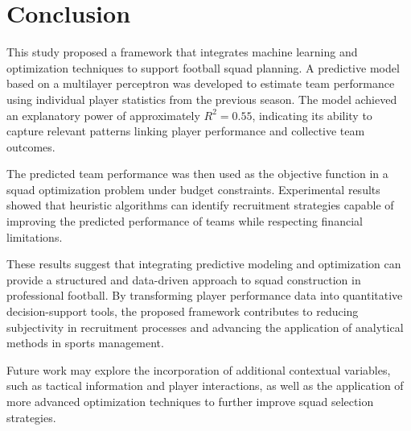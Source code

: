 \documentclass[12pt]{article}
\begin{document}
\section{Conclusion}

This study proposed a framework that integrates machine learning and optimization techniques to support football squad planning. A predictive
model based on a multilayer perceptron was developed to estimate team performance using individual player statistics from the previous season.
The model achieved an explanatory power of approximately $R^2 = 0.55$, indicating its ability to capture relevant patterns linking player
performance and collective team outcomes.

The predicted team performance was then used as the objective function in a squad optimization problem under budget constraints. Experimental
results showed that heuristic algorithms can identify recruitment strategies capable of improving the predicted performance of teams while
respecting financial limitations.

These results suggest that integrating predictive modeling and optimization can provide a structured and data-driven approach to squad
construction in professional football. By transforming player performance data into quantitative decision-support tools, the proposed
framework contributes to reducing subjectivity in recruitment processes and advancing the application of analytical methods in sports
management.

Future work may explore the incorporation of additional contextual variables, such as tactical information and player interactions, as well
as the application of more advanced optimization techniques to further improve squad selection strategies.



\end{document}
